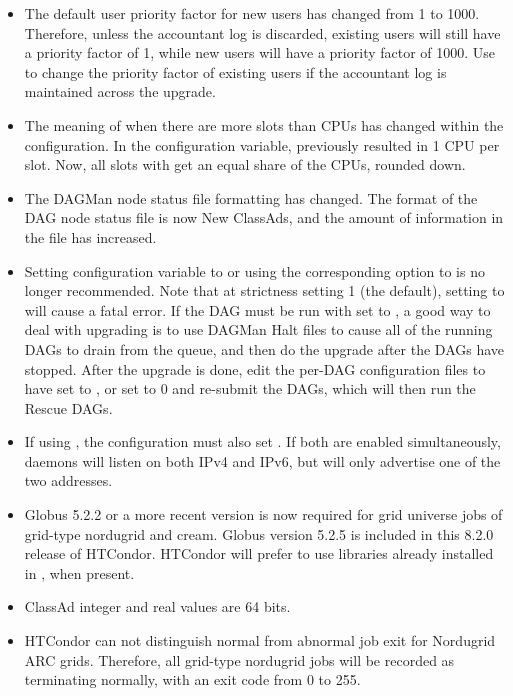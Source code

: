 \begin{itemize}
\item The default user priority factor for new users has changed 
from 1 to 1000.
Therefore, unless the accountant log is discarded,
existing users will still have a priority factor of 1,
while new users will have a priority factor of 1000.
Use  to change the priority factor of existing users
if the accountant log is maintained across the upgrade. 

\item The meaning of  when there are more 
slots than CPUs has changed within the configuration. 
In the  configuration variable,
 previously resulted in 1 CPU per slot. 
Now, all slots with  get an equal share of the CPUs, 
rounded down.

\item The DAGMan node status file formatting has changed.
The format of the DAG node status file is now New ClassAds,
and the amount of information in the file has increased.

\item Setting configuration variable
 to 
or using the corresponding  option
to  is no longer recommended.
Note that at strictness setting 1 (the default), setting
 to 
will cause a fatal error. 
If the DAG must be run with  
set to ,
a good way to deal with upgrading is to use DAGMan Halt files 
to cause all of the running DAGs to drain from the queue, 
and then do the upgrade after the DAGs have stopped.  
After the upgrade is done, 
edit the per-DAG configuration files to have 
 set to ,
or set  to 0 and 
re-submit the DAGs, which will then run the Rescue DAGs.

\item If using , the configuration must
also set .
If both are enabled simultaneously,
daemons will listen on both IPv4 and IPv6, 
but will only advertise one of the two addresses.

\item Globus 5.2.2 or a more recent version is now required 
for grid universe jobs of grid-type nordugrid and cream.
Globus version 5.2.5 is included in this 8.2.0 release of HTCondor.
HTCondor will prefer to use libraries already installed in ,
when present.

\item ClassAd integer and real values are 64 bits.

\item HTCondor can not distinguish normal from abnormal job exit
for Nordugrid ARC grids.
Therefore, all grid-type nordugrid jobs will be recorded as 
terminating normally, with an exit code from 0 to 255.

\end{itemize}

